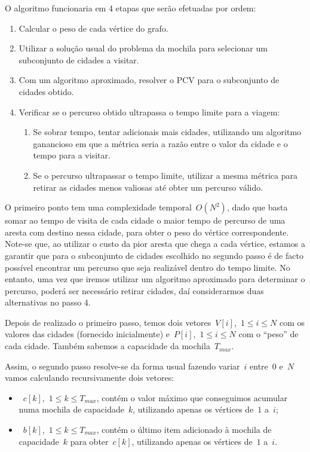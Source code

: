 \documentclass[12pt,a4paper,reqno]{report}
\numberwithin{figure}{section}
\numberwithin{equation}{section}
\numberwithin{figure}{section}
\numberwithin{equation}{section}
\begin{document}
O algoritmo funcionaria em 4 etapas que serão efetuadas por ordem:
\begin{enumerate}
	\item Calcular o peso de cada vértice do grafo.
	\item Utilizar a solução usual do problema da mochila para selecionar um subconjunto de cidades a visitar.
	\item Com um algoritmo aproximado, resolver o PCV para o subconjunto de cidades obtido.
	\item Verificar se o percurso obtido ultrapassa o tempo limite para a viagem:
	\begin{enumerate}[label*=\arabic*.]
		\item Se sobrar tempo, tentar adicionais mais cidades, utilizando um algoritmo ganancioso em que a métrica seria a razão entre o valor da cidade e o tempo para a visitar.
		\item Se o percurso ultrapassar o tempo limite, utilizar a mesma métrica para retirar as cidades menos valiosas até obter um percurso válido.
	\end{enumerate}
\end{enumerate}

O primeiro ponto tem uma complexidade temporal~$O(N^2)$, dado que basta somar ao tempo de visita de cada cidade o maior tempo de percurso de uma aresta com destino nessa cidade, para obter o peso do vértice correspondente. Note-se que, ao utilizar o custo da pior aresta que chega a cada vértice, estamos a garantir que para o subconjunto de cidades escolhido no segundo passo é de facto possível encontrar um percurso que seja realizável dentro do tempo limite. No entanto, uma vez que iremos utilizar um algoritmo aproximado para determinar o percurso, poderá ser necessário retirar cidades, daí considerarmos duas alternativas no passo 4.

Depois de realizado o primeiro passo, temos dois vetores~$V[i]$,~$1 \leq i \leq N$ com os valores das cidades (fornecido inicialmente) e~$P[i]$,~$1 \leq i \leq N$ com o ``peso'' de cada cidade. Também sabemos a capacidade da mochila~$T_{max}$. 

Assim, o segundo passo resolve-se da forma usual fazendo variar~$i$ entre~$0$ e~$N$ vamos calculando recursivamente dois vetores:
\begin{itemize}
	\item~$c[k]$,~$1 \leq k \leq T_{max}$, contém o valor máximo que conseguimos acumular numa mochila de capacidade~$k$, utilizando apenas os vértices de~$1$ a~$i$;
	\item~$b[k]$,~$1 \leq k \leq T_{max}$, contém o último item adicionado à mochila de capacidade~$k$ para obter~$c[k]$, utilizando apenas os vértices de~$1$ a~$i$.
\end{itemize}
\end{document}
